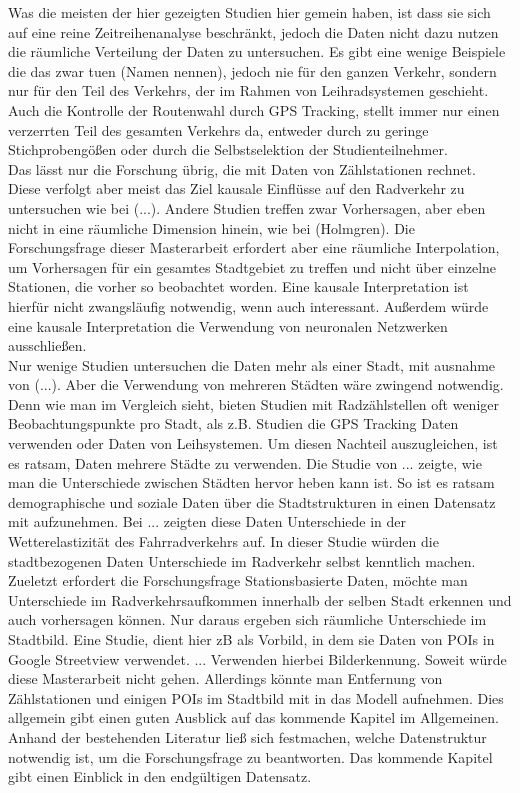 \documentclass[a4paper,12pt]{thesis}
\begin{document}
Was die meisten der hier gezeigten Studien hier gemein haben, ist dass sie sich auf eine reine Zeitreihenanalyse beschränkt, jedoch die Daten nicht dazu nutzen die räumliche Verteilung der Daten zu untersuchen. Es gibt eine wenige Beispiele die das zwar tuen (Namen nennen), jedoch nie für den ganzen Verkehr, sondern nur für den Teil des Verkehrs, der im Rahmen von Leihradsystemen geschieht. Auch die Kontrolle der Routenwahl durch GPS Tracking, stellt immer nur einen verzerrten Teil des gesamten Verkehrs da, entweder durch zu geringe Stichprobengößen oder durch die Selbstselektion der Studienteilnehmer.\\
Das lässt nur die Forschung übrig, die mit Daten von Zählstationen rechnet. Diese verfolgt aber meist das Ziel kausale Einflüsse auf den Radverkehr zu untersuchen wie bei (...). Andere Studien treffen zwar Vorhersagen, aber eben nicht in eine räumliche Dimension hinein, wie bei (Holmgren). Die Forschungsfrage dieser Masterarbeit erfordert aber eine räumliche Interpolation, um Vorhersagen für ein gesamtes Stadtgebiet zu treffen und nicht über einzelne Stationen, die vorher so beobachtet worden. Eine kausale Interpretation ist hierfür nicht zwangsläufig notwendig, wenn auch interessant. Außerdem würde eine kausale Interpretation die Verwendung von neuronalen Netzwerken ausschließen.\\
Nur wenige Studien untersuchen die Daten mehr als einer Stadt, mit ausnahme von (...). Aber die Verwendung von mehreren Städten wäre zwingend notwendig. Denn wie man im Vergleich sieht, bieten Studien mit Radzählstellen oft weniger Beobachtungspunkte pro Stadt, als z.B. Studien die GPS Tracking Daten verwenden oder Daten von Leihsystemen. Um diesen Nachteil auszugleichen, ist es ratsam, Daten mehrere Städte zu verwenden. Die Studie von ... zeigte, wie man die Unterschiede zwischen Städten hervor heben kann ist. So ist es ratsam demographische und soziale Daten über die Stadtstrukturen in einen Datensatz mit aufzunehmen. Bei ... zeigten diese Daten Unterschiede in der Wetterelastizität des Fahrradverkehrs auf. In dieser Studie würden die stadtbezogenen Daten Unterschiede im Radverkehr selbst kenntlich machen.\\
Zueletzt erfordert die Forschungsfrage Stationsbasierte Daten, möchte man Unterschiede im Radverkehrsaufkommen innerhalb der selben Stadt erkennen und auch vorhersagen können. Nur daraus ergeben sich räumliche Unterschiede im Stadtbild. Eine Studie, dient hier zB als Vorbild, in dem sie Daten von POIs in Google Streetview verwendet. ... Verwenden hierbei Bilderkennung. Soweit würde diese Masterarbeit nicht gehen. Allerdings könnte man Entfernung von Zählstationen und einigen POIs im Stadtbild mit in das Modell aufnehmen. Dies allgemein gibt einen guten Ausblick auf das kommende Kapitel im Allgemeinen. Anhand der bestehenden Literatur ließ sich festmachen, welche Datenstruktur notwendig ist, um die Forschungsfrage zu beantworten. Das kommende Kapitel gibt einen Einblick in den endgültigen Datensatz.
\end{document}
